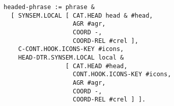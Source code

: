 \documentclass[a4paper]{article}
\begin{document}
{\small\begin{verbatim}
headed-phrase := phrase & 
  [ SYNSEM.LOCAL [ CAT.HEAD head & #head,
                   AGR #agr,
                   COORD -,
                   COORD-REL #crel ],
    C-CONT.HOOK.ICONS-KEY #icons,
    HEAD-DTR.SYNSEM.LOCAL local &
                 [ CAT.HEAD #head,
                   CONT.HOOK.ICONS-KEY #icons,
                   AGR #agr,
                   COORD -,
                   COORD-REL #crel ] ].
\end{verbatim}}
\end{document}

